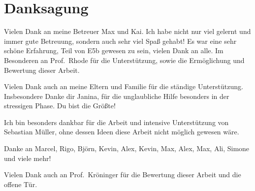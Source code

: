 \thispagestyle{empty}
\section*{\color{tugreen}Danksagung}
%
Vielen Dank an meine Betreuer Max und Kai. Ich habe nicht nur viel gelernt und immer gute Betreuung,
sondern auch sehr viel Spaß gehabt! Es war eine sehr schöne Erfahrung, Teil von E5b gewesen zu sein,
vielen Dank an alle. Im Besonderen an Prof.~Rhode für die Unterstützung, sowie die Ermöglichung und
Bewertung dieser Arbeit.

Vielen Dank auch an meine Eltern und Familie für die ständige Unterstützung. Insbesondere Danke dir
Janina, für die unglaubliche Hilfe besonders in der stressigen Phase. Du bist die Größte!

Ich bin besonders dankbar für die Arbeit und intensive Unterstützung von Sebastian Müller, ohne
dessen Ideen diese Arbeit nicht möglich gewesen wäre.

Danke an Marcel, Rigo, Björn, Kevin, Alex, Kevin, Max, Alex, Max, Ali, Simone und viele mehr!

Vielen Dank auch an Prof.~Kröninger für die Bewertung dieser Arbeit und die offene Tür.
